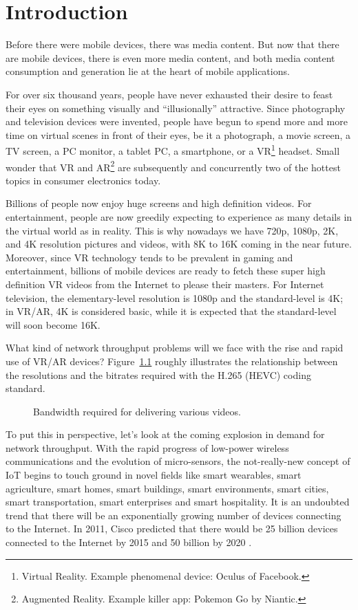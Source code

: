 \chapter{Introduction}\label{sec-introduction}
Before there were mobile devices, there was media content. But now that there are mobile devices, 
there is even more media content, and both media content consumption and generation lie at the heart of mobile applications. 

For over six thousand years, people have never exhausted their desire to feast their eyes on something visually and ``illusionally'' attractive. 
Since photography and television devices were invented, people have begun to spend more and more time on virtual scenes in front of their eyes, be it a photograph, a movie screen, a TV screen, a PC monitor, a tablet PC, a smartphone, or a VR\footnote{Virtual Reality. Example phenomenal device: Oculus of Facebook.} headset.  
Small wonder that VR and AR\footnote{Augmented Reality. Example killer app: Pokemon Go by Niantic.} are subsequently and concurrently two of the hottest topics in consumer electronics today. 

Billions of people now enjoy huge screens and high definition videos. For entertainment,  people are now greedily expecting to experience as many details in the virtual world as in reality. 
This is why nowadays we have 720p, 1080p, 2K, and 4K resolution pictures and videos, with 8K to 16K coming in the near future. 
Moreover, since VR technology tends to be prevalent in gaming and entertainment, billions of mobile devices are ready to fetch these super high definition VR videos from the Internet to please their masters. 
For Internet television, the elementary-level resolution is 1080p and the standard-level is 4K; in VR/AR, 4K is considered basic, while it is expected that the standard-level will soon become 16K. 

What kind of network throughput problems will we face with the rise and rapid use of VR/AR devices? Figure~\ref{fig:bitrate-resolution} roughly illustrates the relationship between the resolutions and the bitrates required with the H.265 (HEVC) coding standard. 

\begin{figure}[ht]
	\centering
	
	\caption{Bandwidth required for delivering various videos.}\label{fig:bitrate-resolution}
\end{figure}

To put this in perspective, let's look at the coming explosion in demand for network throughput. With the rapid progress of low-power wireless communications and the evolution of micro-sensors, the not-really-new concept of IoT begins to touch ground in novel fields like smart wearables, smart agriculture, smart homes, smart buildings, smart environments, smart cities, smart transportation, smart enterprises and smart hospitality. It is an undoubted trend that there will be an exponentially growing number of devices connecting to the Internet. 
In 2011, Cisco predicted that there would be 25 billion devices connected to the Internet by 2015 and 50 billion by 2020 \cite{evans2011internet}. 

